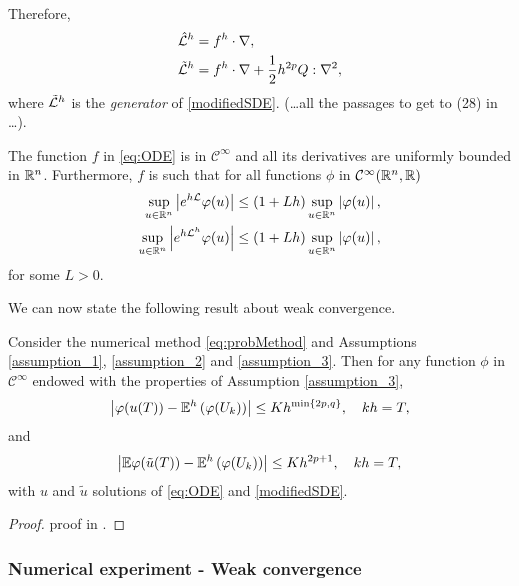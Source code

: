 Therefore,
\begin{equation}
\begin{aligned}
	\hat {\mathcal{L}}^h &= f^h \cdot \nabla, \\
	\tilde {\mathcal{L}}^h &= f^h \cdot \nabla + \frac{1}{2} h^{2p} Q : \nabla^2,
\end{aligned}
\end{equation}
where $\tilde {\mathcal{L}}^h$ is the \textit{generator} of \eqref{modifiedSDE}. (\ldots all the passages to get to (28) in \cite{CGS16} \ldots).
\begin{assumption} \label{assumption_3}The function $f$ in \eqref{eq:ODE} is in $\mathcal C^\infty$ and all its derivatives are uniformly bounded in $\mathbb{R}^n$. Furthermore, $f$ is such that for all functions $\phi$ in $\mathcal C ^\infty(\mathbb{R}^n, \mathbb{R})$ 
\begin{equation}
\begin{aligned}
	\sup_{u\in\mathbb{R}^n} \left| e^{h\mathcal{L}} \varphi(u) \right| &\leq (1 + Lh) \sup_{u\in\mathbb{R}^n} \left|\varphi(u)\right|, \\
	\sup_{u\in\mathbb{R}^n} \left| e^{h\mathcal{L}^h} \varphi(u) \right| &\leq (1 + Lh) \sup_{u\in\mathbb{R}^n} \left|\varphi(u)\right|, \\
\end{aligned}
\end{equation}
for some $L > 0$.
\end{assumption}
\noindent We can now state the following result about weak convergence.
\begin{theorem}\label{thm:weakorder} Consider the numerical method \eqref{eq:probMethod} and Assumptions \ref{assumption_1}, \ref{assumption_2} and \ref{assumption_3}. Then for any function $\phi$ in $\mathcal{C}^\infty$ endowed with the properties of Assumption \ref{assumption_3},
\begin{equation}
	\left|\varphi(u(T)) - \mathbb{E}^h\left(\varphi(U_k)\right)\right| \leq Kh^{\min\{2p, q\}}, \quad kh = T,
\end{equation}
and 
\begin{equation}
\left|\mathbb{E}\varphi(\tilde u(T)) - \mathbb{E}^h\left(\varphi(U_k)\right)\right| \leq Kh^{2p + 1}, \quad kh = T,
\end{equation}
with $u$ and $\tilde u$ solutions of \eqref{eq:ODE} and \eqref{modifiedSDE}.
\end{theorem}
\begin{proof} proof in \cite{CGS16}.
\end{proof}

\subsubsection{Numerical experiment - Weak convergence}

